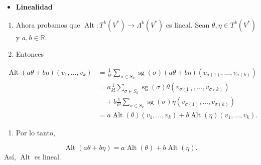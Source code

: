 \begin{bookproof}{}
\begin{itemize}
\item \textbf{Linealidad}
\end{itemize}
\begin{enumerate}
\item Ahora probamos que $\operatorname{Alt}:T^k(V^*)\to\Lambda^k(V^*)$ es lineal. Sean $\theta,\eta\in T^k(V^*)$ y $a,b\in\mathbb R$.
\item Entonces
\end{enumerate}
\[
\begin{aligned}\operatorname{Alt}(a\theta+b\eta)(v_1,\dots,v_k)&=\frac{1}{k!}\sum_{\sigma\in S_k}\operatorname{sg}(\sigma)(a\theta+b\eta)(v_{\sigma(1)},\dots,v_{\sigma(k)})\\&=a\frac{1}{k!}\sum_{\sigma\in S_k}\operatorname{sg}(\sigma)\theta(v_{\sigma(1)},\dots,v_{\sigma(k)})\\&\quad+b\frac{1}{k!}\sum_{\sigma\in S_k}\operatorname{sg}(\sigma)\eta(v_{\sigma(1)},\dots,v_{\sigma(k)})\\&=a\operatorname{Alt}(\theta)(v_1,\dots,v_k)+b\operatorname{Alt}(\eta)(v_1,\dots,v_k).\end{aligned}
\]
\begin{enumerate}[start=3]
\item Por lo tanto,
\end{enumerate}
\[
\operatorname{Alt}(a\theta+b\eta)=a\operatorname{Alt}(\theta)+b\operatorname{Alt}(\eta).
\]
Así, $\operatorname{Alt}$ es lineal.


\end{bookproof}
